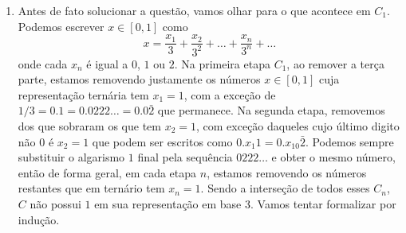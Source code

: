 \begin{enumerate}[label=(\alph*)]
\begin{proof}
        Vamos mostrar  que sequências diferentes de $E,D$ geram pontos diferentes de $C$. Sejam $a = (a_n)_n \neq b = (b_n)_n$ ambas em $\{E,D\}^\N$,
        seja $n_0$ o primeiro natural tal que $a_{n_0} \neq b_{n_0}$, então no $n_0$-passo, uma sequência escolheu ir para a esquerda 
        e a outra escolheu ir para a direita. Suponha sem perda de generalidade que $a_{n_0} = E$ e $b_{n_0} = D$, então
        se $n_0 = 0$, fica claro que para todo $n > 0$, $f(a)_n \in [0,1/3]$ e $f(b)_n \in [2/3,1]$, logo as sequências associadas não podem convergir no mesmo ponto.
        Semelhantemente, se $n_0 > 0$, então sem perda de generalidade, suponha que $a_{n_0 - 1} = b_{n_0 - 1} = E$, temos que $[f(a)_{n_0} = c_{n_0 - 1}, c_{n_0 - 1} + 3^{-n_0} = f(b)_{n_0}] \subset C_{n_0}$
        e desse momento adiante, para $n > n_0$, 
        $$f(a)_n \in [f(a)_{n_0 + 1}, f(a)_{n_0 + 1} + 3^{-n_0 - 1}]$$
        mas
        $$f(b)_n \in [f(b)_{n_0 + 1} - 3^{-n_0 - 1}, f(b)_{n_0 + 1}]$$
        e $f(b)_{n_0} - f(a)_{n_0} = 3^{- n_0}$, portanto são sempre disjuntos por uma distância $3^{-n_0 - 1}$, isso é as sequências $f(a)_n$ e $f(b)_n$ não podem convergir no mesmo ponto.
        Isso prova a injetividade de $f$ e a não enumerabilidade de $C$.
    \end{proof}
    
    \item
    Antes de fato solucionar a questão, vamos olhar para o que acontece em $C_1$. Podemos escrever $x \in [0,1]$ como 
    $$x = \frac{x_1}{3} + \frac{x_2}{3^2} + \dots + \frac{x_n}{3^n} + \dots$$
    onde cada $x_n$ é igual a $0$, $1$ ou $2$. Na primeira etapa $C_1$, ao remover a terça parte,
    estamos removendo justamente os números $x \in [0,1]$ cuja representação ternária tem $x_1 = 1$, com a exceção
    de $1/3 = 0.1 = 0.0222\dots = 0.0\bar{2}$ que permanece. Na segunda etapa, removemos dos que sobraram os que tem $x_2 = 1$, com exceção
    daqueles cujo último digito não $0$ é $x_2 = 1$ que podem ser escritos como $0.x_1 1 = 0.x_10\bar{2}$.
    Podemos sempre substituir o algarismo $1$ final pela sequência $0222\dots$ e obter o mesmo número, então 
    de forma geral, em cada etapa $n$, estamos removendo os números restantes que em ternário tem $x_n = 1$. Sendo a interseção 
    de todos esses $C_n$, $C$ não possui $1$ em sua representação em base 3.  Vamos tentar formalizar por indução.
    

\end{enumerate}
